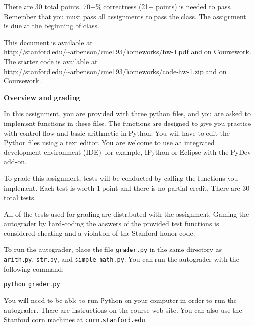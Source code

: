 \documentclass{article}
\newcounter{points}
\begin{document}
\pagestyle{fancy}

There are 30 total points.  70+\% correctness (21+ points) is needed to pass.  Remember that you must pass all assignments to pass the class.  The assignment is due at the beginning of class.

This document is available at \url{http://stanford.edu/~arbenson/cme193/homeworks/hw-1.pdf} and on Coursework.  The starter code is available at \url{http://stanford.edu/~arbenson/cme193/homeworks/code-hw-1.zip} and on Coursework.

\vspace{0.3in}

\textbf{Overview and grading}

In this assignment, you are provided with three python files, and you are asked to implement functions in these files.  The functions are designed to give you practice with control flow and basic arithmetic in Python.  You will have to edit the Python files using a text editor.  You are welcome to use an integrated development environment (IDE), for example, IPython or Eclipse with the PyDev add-on.

To grade this assignment, tests will be conducted by calling the functions you implement.  Each test is worth 1 point and there is no partial credit.  There are 30 total tests.

All of the tests used for grading are distributed with the assignment.  Gaming the autograder by hard-coding the answers of the provided test functions is considered cheating and a violation of the Stanford honor code.

To run the autograder, place the file \texttt{grader.py} in the same directory as \texttt{arith.py}, \texttt{str.py}, and \texttt{simple\_math.py}.  You can run the autograder with the following command:
\begin{center}
\texttt{python grader.py}
\end{center}

You will need to be able to run Python on your computer in order to run the autograder.  There are instructions on the course web site.  You can also use the Stanford corn machines at \texttt{corn.stanford.edu}.

\vspace{0.2in}
\end{document}
